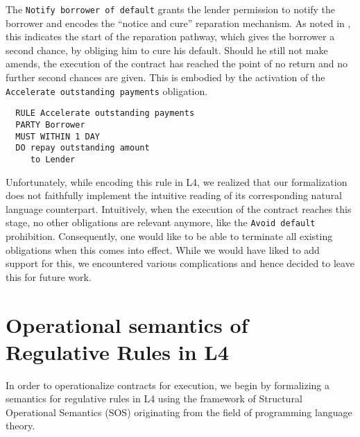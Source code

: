 \documentclass{article}
\begin{document}
The \texttt{Notify borrower of default} grants the lender permission to notify
the borrower and encodes the ``notice and cure'' reparation mechanism.
As noted in \cite{contract_as_automaton}, this indicates the
start of the reparation pathway, which gives the borrower a second chance, by
obliging him to cure his default.
Should he still not make amends, the execution of the contract has reached the
point of no return and no further second chances are given.
This is embodied by the activation of the
\texttt{Accelerate outstanding payments} obligation.

\begin{lstlisting}
  RULE Accelerate outstanding payments			
  PARTY Borrower
  MUST WITHIN 1 DAY	
  DO repay outstanding amount
     to Lender	
\end{lstlisting}

Unfortunately, while encoding this rule in L4, we realized that our
formalization does not faithfully implement the intuitive reading of its
corresponding natural language counterpart.
Intuitively, when the execution of the contract reaches this stage, no other
obligations are relevant anymore, like the \texttt{Avoid default} prohibition.
Consequently, one would like to be able to terminate
all existing obligations when this comes into effect.
While we would have liked to add support for this, we encountered various
complications and hence decided to leave this for future work.

\section{Operational semantics of Regulative Rules in L4}




In order to operationalize contracts for execution, we begin by formalizing a
semantics for regulative rules in L4 using the framework of Structural
Operational Semantics (SOS) 
originating from the field of programming language theory.
\end{document}
